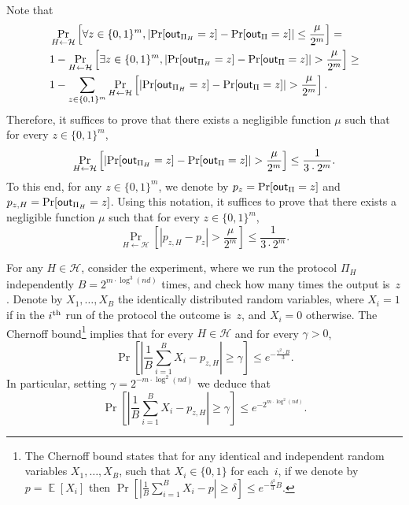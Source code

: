 \documentclass[11pt]{article}
\theoremstyle{plain}
\theoremstyle{definition}
\numberwithin{equation}{section}
\numberwithin{equation}{section} \newcommand{\aka} {also known as\ }
\newcommand{\abs}[1]{\left|#1\right|}
\newcommand\E{\mathop{\mathbb E}}
\newcommand{\Hc}{\mathcal H}
\newcommand{\1}{\mathbf{1}}
\newcommand{\ith}[1]{{#1}\textsuperscript{th}}
\theoremstyle{remark}
\begin{document}
Note that
\begin{align*}
  &\Pr_{H\leftarrow \Hc}\left[\forall z\in\{0,1\}^m, \abs{\Pr[{\sf out}_{\Pi_H}=z]-\Pr[{\sf out}_{\Pi}=z]}\leq\frac{\mu}{2^m}\right]=\\
  &1-\Pr_{H\leftarrow \Hc}\left[\exists z\in\{0,1\}^m, \abs{\Pr[{\sf out}_{\Pi_H}=z]-\Pr[{\sf out}_{\Pi}=z]}>\frac{\mu}{2^m}\right]\geq\\
  &1-\sum_{z\in\{0,1\}^m}\Pr_{H\leftarrow \Hc}\left[\abs{\Pr[{\sf
        out}_{\Pi_H}=z]-\Pr[{\sf out}_{\Pi}=z]}>\frac{\mu}{2^m}\right].
\end{align*}
Therefore, it suffices to prove that there exists a negligible function $\mu$
such that for every $z\in\{0,1\}^m$,
$$
\Pr_{H\leftarrow \Hc}\left[\abs{\Pr[{\sf out}_{\Pi_H}=z]-\Pr[{\sf
      out}_{\Pi}=z]}>\frac{\mu}{2^m}\right]\leq\frac{1}{3\cdot 2^m}.
$$
To this end, for any $z\in\{0,1\}^m$, we denote by $p_z=\Pr[{\sf out}_{\Pi}=z]$
and $p_{z,H}=\Pr[{\sf out}_{\Pi_H}=z]$. Using this notation, it suffices to
prove that there exists a negligible function $\mu$ such that for every
$z\in\{0,1\}^m$,
$$
\Pr_{H\leftarrow
  \Hc}\left[\abs{p_{z,H}-p_z}>\frac{\mu}{2^m}\right]\leq\frac{1}{3\cdot 2^m}.
$$

For any $H\in\Hc$, consider the experiment, where we run the protocol $\Pi_H$
independently $B=2^{m\cdot\log^3(nd)}$ times, and check how many times the
output is~$z$. Denote by $X_1,\ldots,X_B$ the identically distributed random
variables, where $X_i=1$ if in the $\ith{i}$ run of the protocol the outcome
is~$z$, and $X_i=0$ otherwise.  The Chernoff bound\footnote{The Chernoff bound
  states that for any identical and independent random variables
  $X_1,\ldots,X_B$, such that $X_i\in\{0,1\}$ for each~$i$, if we denote by
  $p=\E[X_i]$ then $\Pr[\left|\frac{1}{B}\sum_{i=1}^B
    X_i-p\right|\geq\delta]\leq e^{-\frac{\delta^2}{3} B}$.} implies that for
every $H\in\Hc$ and for every $\gamma>0$,
$$
\Pr\left[\left|\frac{1}{B}\sum_{i=1}^B X_i- p_{z,H}\right|\geq \gamma\right]\leq
e^{-\frac{\gamma^2\cdot B}{3}}.
$$
In particular, setting $\gamma=2^{-m\cdot \log^2(nd)}$ we deduce that
\begin{equation}\label{eqn:X}
  \Pr\left[\left|\frac{1}{B}\sum_{i=1}^B X_i-p_{z,H}\right|\geq \gamma\right]\leq e^{-2^{m\cdot \log^2(nd)}}.
\end{equation}
\end{document}
